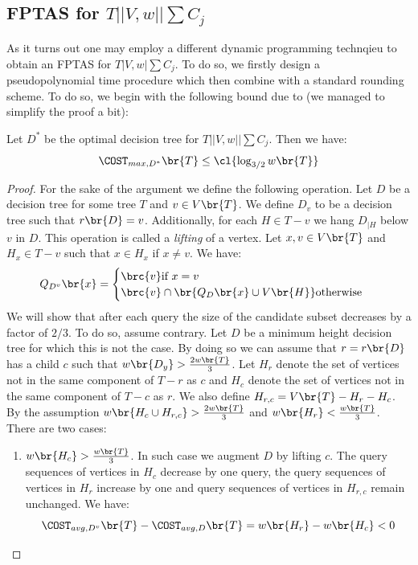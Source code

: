 \subsection{FPTAS for $T||V,w||\sum C_j$}
As it turns out one may employ a different dynamic programming technqieu to obtain an FPTAS for $T|V,w|\sum C_j$. To do so, we firstly design a pseudopolynomial time procedure which then combine with a standard rounding scheme. To do so, we begin with the following bound due to \cite{Fast_app_centroid_trees} (we managed to simplify the proof a bit):
\begin{theorem}
    Let $D^*$ be the optimal decision tree for $T||V,w||\sum C_j$. Then we have:
    $$\COST_{max, D^*}\br{T}\leq \cl{\log_{3/2}w\br{T}}$$
    \begin{proof}
        For the sake of the argument we define the following operation. Let $D$ be a decision tree for some tree $T$ and $v\in V\br{T}$. We define $D_v$ to be a decision tree such that $r\br{D}=v$. Additionally, for each $H\in T-v$ we hang $D_{|H}$ below $v$ in $D$. This operation is called a \textit{lifting} of a vertex. Let $x,v\in V\br{T}$ and $H_x\in T-v$ such that $x\in H_x$ if $x\neq v$. We have:
        $$
        Q_{D^v}\br{x}=\begin{cases}
            \brc{v} \text{if } x=v\\
            \brc{v}\cap \br{Q_{D}\br{x}\cup V\br{H}} \text{otherwise }
        \end{cases}
        $$
        We will show that after each query the size of the candidate subset decreases by a factor of $2/3$. To do so, assume contrary. Let $D$ be a minimum height decision tree for which this is not the case. By doing so we can assume that $r=r\br{D}$ has a child $c$ such that $w\br{D_y}> \frac{2w\br{T}}{3}$. Let $H_r$ denote the set of vertices not in the same component of $T-r$ as $c$ and $H_c$ denote the set of vertices not in the same component of $T-c$ as $r$. We also define $H_{r, c}=V\br{T}-H_r-H_c$. By the assumption $w\br{H_c\cup H_{r, c}}>\frac{2w\br{T}}{3}$ and $w\br{H_r}<\frac{w\br{T}}{3}$. There are two cases:
        \begin{enumerate}
            \item $w\br{H_c}>\frac{w\br{T}}{3}$. In such case we augment $D$ by lifting $c$. The query sequences of vertices in $H_c$ decrease by one query, the
query sequences of vertices in $H_r$ increase by one and query sequences of vertices in $H_{r,c}$ remain unchanged. We have:
$$
\COST_{avg, D^v}\br{T}-\COST_{avg, D}\br{T}=w\br{H_r}-w\br{H_c}< 0
$$
\end{enumerate}
\end{proof}
\end{theorem}
